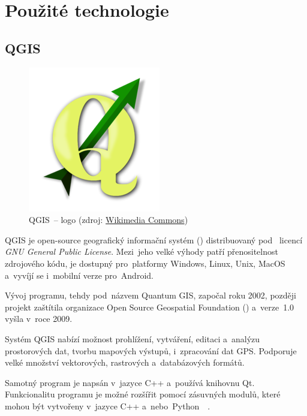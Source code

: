 \chapter{Použité technologie}
\label{technologie}

\section{QGIS}
\label{qgis}

	\begin{figure}[H] \centering
		\includegraphics[width=.3\textwidth]{./pictures/qgis_logo.png}
      	\caption[QGIS~– logo]{QGIS~– logo (zdroj:
\href{http://commons.wikimedia.org/wiki/File:QGis_Logo.png}{Wikimedia
Commons})}
		\label{fig:qgis_logo}
 	\end{figure}

QGIS je open-source geografický informační systém ()
distribuovaný pod ~licencí \textit{GNU General Public
License}. Mezi~jeho velké výhody patří přenositelnost zdrojového kódu,
je dostupný pro~platformy Windows, Linux, Unix, MacOS a~vyvíjí se
i~mobilní verze pro~Android.

Vývoj programu, tehdy pod~názvem Quantum GIS, započal roku 2002,
později projekt zaštítila organizace Open Source Geospatial Foundation
() a~verze~1.0 vyšla v~roce 2009.

Systém QGIS nabízí možnost prohlížení, vytváření, editaci a~analýzu
prostorových dat, tvorbu mapových výstupů, i~zpracování dat
GPS. Podporuje velké množství vektorových, rastrových a~databázových
formátů.

Samotný program je napsán v~jazyce C++ a~používá knihovnu
Qt. Funkcionalitu programu je možné rozšířit pomocí zásuvných modulů,
které mohou být vytvořeny v~jazyce C++
a~nebo~Python~\citep{qgis}~\citep{wiki_qgis}.

